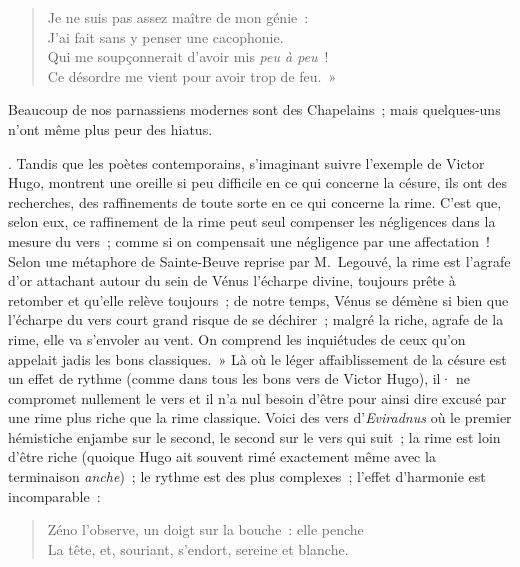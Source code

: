 \documentclass[french,twoside]{book} %
\begin{document}
{\begin{verse}
Je ne suis pas assez maître de mon génie :\\
J’ai fait sans y penser une cacophonie.\\
Qui me soupçonnerait d’avoir mis \emph{peu à peu} !\\
Ce désordre me vient pour avoir trop de feu. »\\
\end{verse}
\par
\noindent Beaucoup de nos parnassiens modernes sont des Chapelains ; mais quelques-uns n’ont même plus peur des hiatus.
}. Tandis que les poètes contemporains, s’imaginant suivre l’exemple de Victor Hugo, montrent une oreille si peu difficile en ce qui concerne la césure, ils ont des recherches, des raffinements de toute sorte en ce qui concerne la rime. C’est que, selon eux, ce raffinement de la rime peut seul compenser les négligences dans la mesure du vers ; comme si on compensait une négligence par une affectation ! Selon une métaphore de Sainte-Beuve reprise par M. Legouvé, la rime est l’agrafe d’or attachant autour du sein de Vénus l’écharpe divine, toujours prête à retomber et qu’elle relève toujours ; de notre temps, Vénus se démène si bien que l’écharpe du  vers court grand risque de se déchirer ; malgré la riche, agrafe de la rime, elle va s’envoler au vent. On comprend les inquiétudes de ceux qu’on appelait jadis les bons classiques. » Là où le léger affaiblissement de la césure est un effet de rythme (comme dans tous les bons vers de Victor Hugo), il· ne compromet nullement le vers et il n’a nul besoin d’être pour ainsi dire excusé par une rime plus riche que la rime classique. Voici des vers d’\emph{Eviradnus} où le premier hémistiche enjambe sur le second, le second sur le vers qui suit ; la rime est loin d’être riche (quoique Hugo ait souvent rimé exactement même avec la terminaison \emph{anche}) ; le rythme est des plus complexes ; l’effet d’harmonie est incomparable :\par


\begin{verse}
Zéno l’observe, un doigt sur la bouche : elle penche\\
La tête, et, souriant, s’endort, sereine et blanche.\\
\end{verse}
\end{document}
